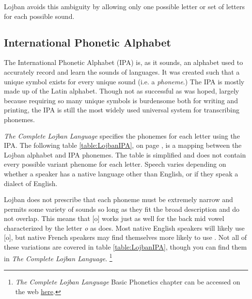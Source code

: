 \documentclass[12pt]{book}
\begin{document}
Lojban avoids this ambiguity by allowing only one possible letter or set of letters for each possible sound. 




\subsection{International Phonetic Alphabet}

The International Phonetic Alphabet (IPA) is, as it sounds, an alphabet used to accurately record and learn the sounds of languages. It was created such that a unique symbol exists for every unique sound (i.e. a \emph{phoneme}.) The IPA is mostly made up of the Latin alphabet. Though not as successful as was hoped, largely because requiring so many unique symbols is burdensome both for writing and printing, the IPA is still the most widely used universal system for transcribing phonemes. \cite[Micropedia 6, p.~352]{EB} 

\textit{The Complete Lojban Language} specifies the phonemes for each letter using the IPA. \cite[3.2 Basic Phonetics]{CLL} The following table \ref{table:LojbanIPA}, on page \pageref{table:LojbanIPA}, is a mapping between the Lojban alphabet and IPA phonemes.
The table is simplified and does not contain every possible variant phenome for each letter. Speech varies depending on whether a speaker has a native language other than English, or if they speak a dialect of English. 

Lojban does not prescribe that each phoneme must be extremely narrow and permits some variety of sounds so long as they fit the broad description and do not overlap. This means that [o] works just as well for the back mid vowel characterized by the letter \emph{o} as \textipa{[O]} does. Most native English speakers will likely use [o], but native French speakers may find themselves more likely to use \textipa{[O]}. Not all of these variations are covered in table \ref{table:LojbanIPA}, though you can find them in \textit{The Complete Lojban Language}. \footnote{ \textit{The Complete Lojban Language} Basic Phonetics chapter can be accessed on the web \href{https://lojban.github.io/cll/3/2/}{here}. }
\end{document}

